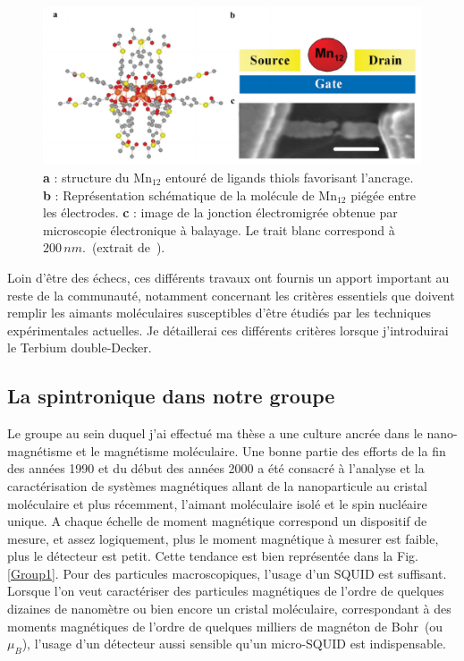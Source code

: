 \begin{figure}
\centering \includegraphics[scale=0.45]{Spintronique/MolSpintro/MolSpintro.pdf}
\caption{\textbf{a} : structure du Mn$_{12}$ entouré de ligands thiols favorisant l'ancrage. \textbf{b} : Représentation schématique de la molécule de Mn$_{12}$ piégée entre les électrodes. \textbf{c} : image de la jonction électromigrée obtenue par microscopie électronique à balayage. Le trait blanc correspond à $200\,nm$.~(extrait de~\cite{Heersche2006}).}
\label{MolSpintro}
\end{figure}

Loin d'\^etre des échecs, ces différents travaux ont fournis un apport important au reste de la communauté, notamment concernant les critères essentiels que doivent remplir les aimants moléculaires susceptibles d'être étudiés par les techniques expérimentales actuelles. Je détaillerai ces différents critères lorsque j'introduirai le Terbium double-Decker.
 
\subsection{La spintronique dans notre groupe}
Le groupe au sein duquel j'ai effectué ma thèse a une culture ancrée dans le nano-magnétisme et le magnétisme moléculaire. Une bonne partie des efforts de la fin des années 1990 et du début des années 2000 a été consacré à l'analyse et la caractérisation de systèmes magnétiques allant de la nanoparticule au cristal moléculaire  et plus récemment, l'aimant moléculaire isolé et le spin nucléaire unique. A chaque échelle de moment magnétique correspond un dispositif de mesure, et assez logiquement, plus le moment magnétique à mesurer est faible, plus le détecteur est petit. Cette tendance est bien représentée dans la Fig.\ref{Group1}. Pour des particules macroscopiques, l'usage d'un SQUID est suffisant. Lorsque l'on veut caractériser des particules magnétiques de l'ordre de quelques dizaines de nanomètre ou bien encore un cristal moléculaire, correspondant à des moments magnétiques de l'ordre de quelques milliers de magnéton de Bohr~(ou $\mu_B$), l'usage d'un détecteur aussi sensible qu'un micro-SQUID est indispensable.


